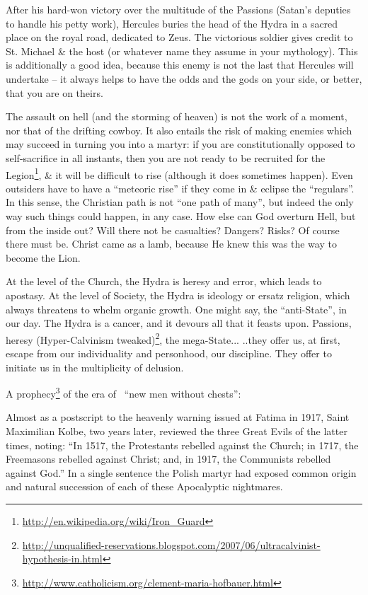 After his hard-won victory over the multitude of the Passions (Satan's deputies to handle his petty work), Hercules buries the head of the Hydra in a sacred place on the royal road, dedicated to Zeus. The victorious soldier gives credit to St. Michael \& the host (or whatever name they assume in your mythology). This is additionally a good idea, because this enemy is not the last that Hercules will undertake -- it always helps to have the odds and the gods on your side, or better, that you are on theirs.

The assault on hell (and the storming of heaven) is not the work of a moment, nor that of the drifting cowboy. It also entails the risk of making enemies which may succeed in turning you into a martyr: if you are constitutionally opposed to self-sacrifice in all instants, then you are not ready to be recruited for the Legion\footnote{\url{http://en.wikipedia.org/wiki/Iron_Guard}}, \& it will be difficult to rise (although it does sometimes happen). Even outsiders have to have a ``meteoric rise'' if they come in \& eclipse the ``regulars''. In this sense, the Christian path is not ``one path of many'', but indeed the only way such things could happen, in any case. How else can God overturn Hell, but from the inside out? Will there not be casualties? Dangers? Risks? Of course there must be. Christ came as a lamb, because He knew this was the way to become the Lion.

At the level of the Church, the Hydra is heresy and error, which leads to apostasy. At the level of Society, the Hydra is ideology or ersatz religion, which always threatens to whelm organic growth. One might say, the ``anti-State'', in our day. The Hydra is a cancer, and it devours all that it feasts upon. Passions, heresy (Hyper-Calvinism tweaked)\footnote{\url{http://unqualified-reservations.blogspot.com/2007/06/ultracalvinist-hypothesis-in.html}}, the mega-State... ..they offer us, at first, escape from our individuality and personhood, our discipline. They offer to initiate us in the multiplicity of delusion.

A prophecy\footnote{\url{http://www.catholicism.org/clement-maria-hofbauer.html}} of the era of~ ``new men without chests'':

\begin{quotex}
Almost as a postscript to the heavenly warning issued at Fatima in 1917, Saint Maximilian Kolbe, two years later, reviewed the three Great Evils of the latter times, noting: ``In 1517, the Protestants rebelled against the Church; in 1717, the Freemasons rebelled against Christ; and, in 1917, the Communists rebelled against God.'' In a single sentence the Polish martyr had exposed common origin and natural succession of each of these Apocalyptic nightmares.
\end{quotex}


